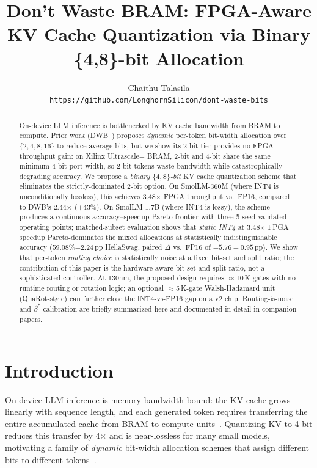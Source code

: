 \documentclass{article}
\title{\textbf{Don't Waste BRAM: FPGA-Aware KV Cache Quantization via Binary \{4,8\}-bit Allocation}}
\author{
  Chaithu Talasila\\
  \texttt{https://github.com/LonghornSilicon/dont-waste-bits}
}
\date{}
\begin{document}
\maketitle

\begin{abstract}
On-device LLM inference is bottlenecked by KV cache bandwidth from BRAM to compute. Prior work (DWB~\citep{haeri2026dwb}) proposes \emph{dynamic} per-token bit-width allocation over $\{2,4,8,16\}$ to reduce average bits, but we show its 2-bit tier provides no FPGA throughput gain: on Xilinx Ultrascale+ BRAM, 2-bit and 4-bit share the same minimum 4-bit port width, so 2-bit tokens waste bandwidth while catastrophically degrading accuracy. We propose a \emph{binary $\{4,8\}$-bit} KV cache quantization scheme that eliminates the strictly-dominated 2-bit option. On SmolLM-360M (where INT4 is unconditionally lossless), this achieves 3.48$\times$ FPGA throughput vs.\ FP16, compared to DWB's 2.44$\times$ ($+$43\%). On SmolLM-1.7B (where INT4 is lossy), the scheme produces a continuous accuracy--speedup Pareto frontier with three 5-seed validated operating points; matched-subset evaluation shows that \emph{static INT4} at 3.48$\times$ FPGA speedup Pareto-dominates the mixed allocations at statistically indistinguishable accuracy (59.08\%$\pm$2.24\,pp HellaSwag, paired $\Delta$ vs.\ FP16 of $-5.76\pm0.95$\,pp). We show that per-token \emph{routing choice} is statistically noise at a fixed bit-set and split ratio; the contribution of this paper is the hardware-aware bit-set and split ratio, not a sophisticated controller. At 130nm, the proposed design requires $\approx$10\,K gates with no runtime routing or rotation logic; an optional $\approx$5\,K-gate Walsh-Hadamard unit (QuaRot-style) can further close the INT4-vs-FP16 gap on a v2 chip. Routing-is-noise and $\beta^*$-calibration are briefly summarized here and documented in detail in companion papers.
\end{abstract}

\section{Introduction}
\label{sec:intro}

On-device LLM inference is memory-bandwidth-bound: the KV cache grows linearly with sequence length, and each generated token requires transferring the entire accumulated cache from BRAM to compute units~\citep{liu2024kivi,hooper2024kvquant}. Quantizing KV to 4-bit reduces this transfer by 4$\times$ and is near-lossless for many small models, motivating a family of \emph{dynamic} bit-width allocation schemes that assign different bits to different tokens~\citep{haeri2026dwb}.
\end{document}

